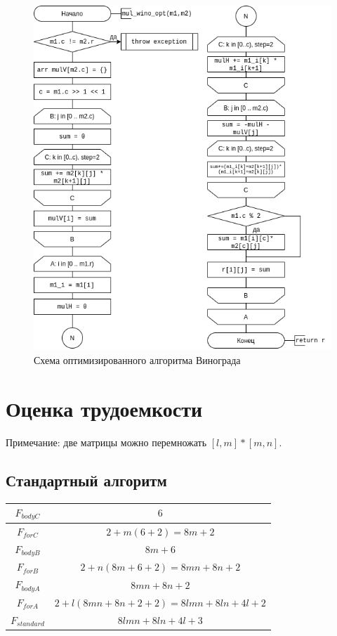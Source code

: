 \begin{figure}[h!]
    \centering
    \includegraphics[width=1\textwidth]{2/inc/d3.png}
    \caption{Схема оптимизированного алгоритма Винограда}
    \label{fig:2.2}
\end{figure}

\clearpage
\section{Оценка трудоемкости}

Примечание: две матрицы можно перемножать $[l,m] * [m,n]$.


\subsection{Стандартный алгоритм}


\begin{tabular}{|c|c|}
    \hline
    $F_{bodyC}$ & $6$ \\\hline
    $F_{forC}$  & $2 + m (6 + 2) = 8m + 2$ \\\hline
    $F_{bodyB}$ & $8m + 6$ \\\hline
    $F_{forB}$  & $2 + n (8m + 6 + 2) = 8mn + 8n + 2$ \\\hline
    $F_{bodyA}$ & $8mn + 8n + 2$ \\\hline
    $F_{forA}$  & $2 + l (8mn + 8n + 2 + 2) = 8lmn + 8ln + 4l + 2$ \\\hline
    $F_{standard}$ & $8lmn + 8ln + 4l + 3$ \\\hline
\end{tabular}


